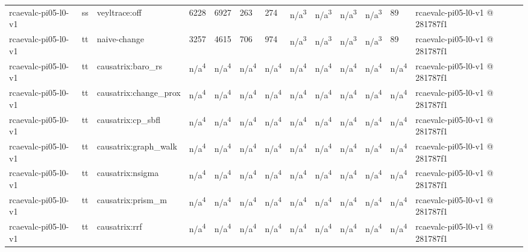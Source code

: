 \begin{table}[t]
\begin{tabular}{lllllllllllll}
rcaevalc-pi05-l0-v1 & ss & veyltrace:off & 6228 & 6927 & 263 & 274 & n/a\textsuperscript{3} & n/a\textsuperscript{3} & n/a\textsuperscript{3} & n/a\textsuperscript{3} & 89 & rcaevalc-pi05-l0-v1 @ 281787f1 \\
rcaevalc-pi05-l0-v1 & tt & naive-change & 3257 & 4615 & 706 & 974 & n/a\textsuperscript{3} & n/a\textsuperscript{3} & n/a\textsuperscript{3} & n/a\textsuperscript{3} & 89 & rcaevalc-pi05-l0-v1 @ 281787f1 \\
rcaevalc-pi05-l0-v1 & tt & causatrix:baro\_rs & n/a\textsuperscript{4} & n/a\textsuperscript{4} & n/a\textsuperscript{4} & n/a\textsuperscript{4} & n/a\textsuperscript{4} & n/a\textsuperscript{4} & n/a\textsuperscript{4} & n/a\textsuperscript{4} & n/a\textsuperscript{4} & rcaevalc-pi05-l0-v1 @ 281787f1 \\
rcaevalc-pi05-l0-v1 & tt & causatrix:change\_prox & n/a\textsuperscript{4} & n/a\textsuperscript{4} & n/a\textsuperscript{4} & n/a\textsuperscript{4} & n/a\textsuperscript{4} & n/a\textsuperscript{4} & n/a\textsuperscript{4} & n/a\textsuperscript{4} & n/a\textsuperscript{4} & rcaevalc-pi05-l0-v1 @ 281787f1 \\
rcaevalc-pi05-l0-v1 & tt & causatrix:cp\_sbfl & n/a\textsuperscript{4} & n/a\textsuperscript{4} & n/a\textsuperscript{4} & n/a\textsuperscript{4} & n/a\textsuperscript{4} & n/a\textsuperscript{4} & n/a\textsuperscript{4} & n/a\textsuperscript{4} & n/a\textsuperscript{4} & rcaevalc-pi05-l0-v1 @ 281787f1 \\
rcaevalc-pi05-l0-v1 & tt & causatrix:graph\_walk & n/a\textsuperscript{4} & n/a\textsuperscript{4} & n/a\textsuperscript{4} & n/a\textsuperscript{4} & n/a\textsuperscript{4} & n/a\textsuperscript{4} & n/a\textsuperscript{4} & n/a\textsuperscript{4} & n/a\textsuperscript{4} & rcaevalc-pi05-l0-v1 @ 281787f1 \\
rcaevalc-pi05-l0-v1 & tt & causatrix:nsigma & n/a\textsuperscript{4} & n/a\textsuperscript{4} & n/a\textsuperscript{4} & n/a\textsuperscript{4} & n/a\textsuperscript{4} & n/a\textsuperscript{4} & n/a\textsuperscript{4} & n/a\textsuperscript{4} & n/a\textsuperscript{4} & rcaevalc-pi05-l0-v1 @ 281787f1 \\
rcaevalc-pi05-l0-v1 & tt & causatrix:prism\_m & n/a\textsuperscript{4} & n/a\textsuperscript{4} & n/a\textsuperscript{4} & n/a\textsuperscript{4} & n/a\textsuperscript{4} & n/a\textsuperscript{4} & n/a\textsuperscript{4} & n/a\textsuperscript{4} & n/a\textsuperscript{4} & rcaevalc-pi05-l0-v1 @ 281787f1 \\
rcaevalc-pi05-l0-v1 & tt & causatrix:rrf & n/a\textsuperscript{4} & n/a\textsuperscript{4} & n/a\textsuperscript{4} & n/a\textsuperscript{4} & n/a\textsuperscript{4} & n/a\textsuperscript{4} & n/a\textsuperscript{4} & n/a\textsuperscript{4} & n/a\textsuperscript{4} & rcaevalc-pi05-l0-v1 @ 281787f1 \\

\end{tabular}
\end{table}
